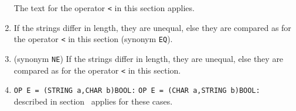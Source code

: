 \begin{enumerate}
The text for the operator \verb|<| in this section applies.
\item {}\newline
If the strings differ in length, they are unequal, else they are
compared as for the operator \verb|<| in this section
(synonym \verb|EQ|).
\item {}\newline
(synonym \verb|NE|)\newline
If the strings differ in length, they are unequal, else they are
compared as for the operator \verb|<| in this section.
\item \verb|OP E = (STRING a,CHAR b)BOOL:| \newline
\verb|OP E = (CHAR a,STRING b)BOOL:| \newline
{} 
  described in
section~ applies for these cases.
\end{enumerate}

